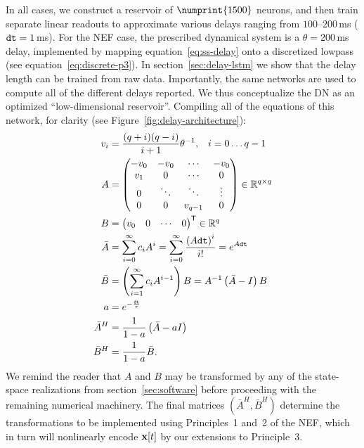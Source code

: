 In all cases, we construct a reservoir of $\numprint{1500}$ neurons, and then train separate linear readouts to approximate various delays ranging from $100$--$200$\,ms ($\texttt{dt}{} = 1$\,ms).
For the NEF case, the prescribed dynamical system is a $\theta = 200$\,ms delay, implemented by mapping equation~\ref{eq:ss-delay} onto a discretized lowpass (see equation~\ref{eq:discrete-p3}).
In section~\ref{sec:delay-lstm} we show that the delay length can be trained from raw data.
Importantly, the same networks are used to compute all of the different delays reported.
We thus conceptualize the DN as an optimized ``low-dimensional reservoir''.
Compiling all of the equations of this network, for clarity (see Figure~\ref{fig:delay-architecture}):
\begin{equation} \label{eq:delay-compiled}
\begin{aligned}
v_i &= \frac{(q+i)(q-i)}{i+1} \theta^{-1} \text{,} \quad i = 0 \ldots q-1 \\
A &= \begin{pmatrix} -v_0 & -v_0 & \cdots & -v_0 \\ v_1 & 0 & \cdots & 0 \\ 0 & \ddots & \ddots & \vdots \\ 0 & 0 & v_{q-1} & 0\end{pmatrix} \in \mathbb{R}^{q \times q} \\
B &= {\begin{pmatrix} v_0 & 0 & \cdots & 0\end{pmatrix}}^\mathsf{T} \in \mathbb{R}^{q} \\
\bar{A} &= \sum_{i=0}^\infty c_i A^i = \sum_{i=0}^\infty \frac{\left(A\texttt{dt}{}\right)^i}{i!} = e^{A\texttt{dt}{}}  \\
\bar{B} &= \left( \sum_{i=1}^\infty c_i A^{i-1} \right) B = A^{-1} \left(\bar{A} - I\right) B  \\
a &= e^{-\frac{\texttt{dt}{}}{\tau}} \\
\bar{A}^H &= \frac{1}{1 - a} \left(\bar{A} - aI\right) \\
\bar{B}^H &= \frac{1}{1-a}\bar{B} \text{.}
\end{aligned}
\end{equation}
We remind the reader that $A$ and $B$ may be transformed by any of the state-space realizations from section~\ref{sec:software} before proceeding with the remaining numerical machinery.
The final matrices $(\bar{A}^H\text{,}\, \bar{B}^H)$ determine the transformations to be implemented using Principles~1 and~2 of the NEF, which in turn will nonlinearly encode $\mathbf{x}[t]$ by our extensions to Principle~3.

